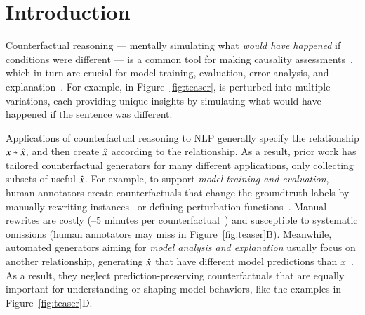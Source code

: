 \section{Introduction}
\label{sec:intro}



Counterfactual reasoning --- mentally simulating what \emph{would have happened} if conditions were different --- is a common tool for making causality assessments~\cite{kahneman}, which in turn are crucial for model training, evaluation, error analysis, and explanation~\cite{miller}. 
For example, in Figure~\ref{fig:teaser},  is perturbed into multiple variations, each providing unique insights by simulating what would have happened if the sentence was different.

Applications of counterfactual reasoning to NLP generally specify the relationship $x \veryshortarrow \xp$, and then create $\hat{x}$ according to the relationship.
As a result, prior work has tailored counterfactual generators for many different applications, only collecting subsets of useful $\hat{x}$.
For example, to support {\em model training and evaluation}, human annotators create counterfactuals that change the groundtruth labels by manually rewriting instances~\cite{gardner2020contrast} or defining perturbation functions~\cite{checklist:acl20}.
Manual rewrites are costly (--5 minutes per counterfactual~\cite{kaushik2019learning}) and susceptible to systematic omissions (\eg human annotators may miss  in Figure~\ref{fig:teaser}B).
Meanwhile, automated generators aiming for \emph{model analysis and explanation} usually focus on another relationship, \ie generating $\hat{x}$ that have different model predictions than $x$~\cite{ross2020explaining, Zhang2019GeneratingFA}. 
As a result, they neglect prediction-preserving counterfactuals that are equally important for understanding or shaping model behaviors, like the examples in Figure~\ref{fig:teaser}D.


